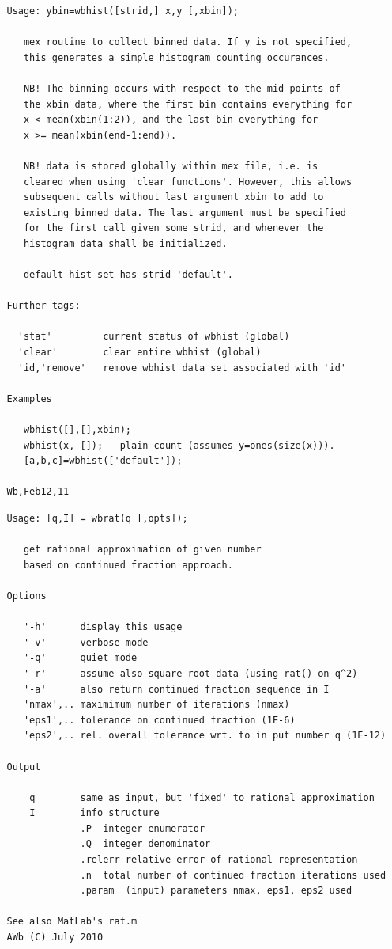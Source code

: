 \documentclass[twoside,12pt]{article}
\begin{document}
\begin{verbatim}
   Usage: ybin=wbhist([strid,] x,y [,xbin]);
 
      mex routine to collect binned data. If y is not specified,
      this generates a simple histogram counting occurances.
 
      NB! The binning occurs with respect to the mid-points of
      the xbin data, where the first bin contains everything for
      x < mean(xbin(1:2)), and the last bin everything for
      x >= mean(xbin(end-1:end)).
 
      NB! data is stored globally within mex file, i.e. is
      cleared when using 'clear functions'. However, this allows
      subsequent calls without last argument xbin to add to
      existing binned data. The last argument must be specified
      for the first call given some strid, and whenever the
      histogram data shall be initialized.
 
      default hist set has strid 'default'.
 
   Further tags:
 
     'stat'         current status of wbhist (global)
     'clear'        clear entire wbhist (global)
     'id,'remove'   remove wbhist data set associated with 'id'
 
   Examples
 
      wbhist([],[],xbin);
      wbhist(x, []);   plain count (assumes y=ones(size(x))).
      [a,b,c]=wbhist(['default']);
 
   Wb,Feb12,11
\end{verbatim}

\pagebreak[3]



\begin{verbatim}
   Usage: [q,I] = wbrat(q [,opts]);
 
      get rational approximation of given number
      based on continued fraction approach.
 
   Options
 
      '-h'      display this usage
      '-v'      verbose mode
      '-q'      quiet mode
      '-r'      assume also square root data (using rat() on q^2)
      '-a'      also return continued fraction sequence in I
      'nmax',.. maximimum number of iterations (nmax)
      'eps1',.. tolerance on continued fraction (1E-6)
      'eps2',.. rel. overall tolerance wrt. to in put number q (1E-12)
 
   Output
 
       q        same as input, but 'fixed' to rational approximation
       I        info structure
                .P  integer enumerator
                .Q  integer denominator
                .relerr relative error of rational representation
                .n  total number of continued fraction iterations used
                .param  (input) parameters nmax, eps1, eps2 used
 
   See also MatLab's rat.m
   AWb (C) July 2010
\end{verbatim}
\end{document}
